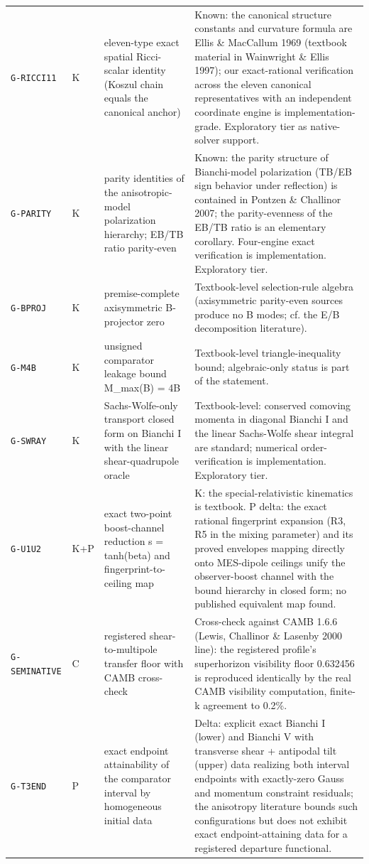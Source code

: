 \documentclass[10pt]{article}
\theoremstyle{definition}
\newcommand{\code}[1]{\texttt{\small #1}}
\begin{document}
\begin{center}
\begin{longtable}{p{2.0cm} p{0.7cm} p{5.4cm} p{6.5cm}}
\code{G-RICCI11} & K & eleven-type exact spatial Ricci-scalar identity (Koszul chain equals the canonical anchor) & Known: the canonical structure constants and curvature formula are Ellis \& MacCallum 1969 (textbook material in Wainwright \& Ellis 1997); our exact-rational verification across the eleven canonical representatives with an independent coordinate engine is implementation-grade. Exploratory tier as native-solver support. \\[2pt]
\code{G-PARITY} & K & parity identities of the anisotropic-model polarization hierarchy; EB/TB ratio parity-even & Known: the parity structure of Bianchi-model polarization (TB/EB sign behavior under reflection) is contained in Pontzen \& Challinor 2007; the parity-evenness of the EB/TB ratio is an elementary corollary. Four-engine exact verification is implementation. Exploratory tier. \\[2pt]
\code{G-BPROJ} & K & premise-complete axisymmetric B-projector zero & Textbook-level selection-rule algebra (axisymmetric parity-even sources produce no B modes; cf. the E/B decomposition literature). \\[2pt]
\code{G-M4B} & K & unsigned comparator leakage bound M\_max(B) = 4B & Textbook-level triangle-inequality bound; algebraic-only status is part of the statement. \\[2pt]
\code{G-SWRAY} & K & Sachs-Wolfe-only transport closed form on Bianchi I with the linear shear-quadrupole oracle & Textbook-level: conserved comoving momenta in diagonal Bianchi I and the linear Sachs-Wolfe shear integral are standard; numerical order-verification is implementation. Exploratory tier. \\[2pt]
\code{G-U1U2} & K+P & exact two-point boost-channel reduction s = tanh(beta) and fingerprint-to-ceiling map & K: the special-relativistic kinematics is textbook. P delta: the exact rational fingerprint expansion (R3, R5 in the mixing parameter) and its proved envelopes mapping directly onto MES-dipole ceilings unify the observer-boost channel with the bound hierarchy in closed form; no published equivalent map found. \\[2pt]
\code{G-SEMINATIVE} & C & registered shear-to-multipole transfer floor with CAMB cross-check & Cross-check against CAMB 1.6.6 (Lewis, Challinor \& Lasenby 2000 line): the registered profile's superhorizon visibility floor 0.632456 is reproduced identically by the real CAMB visibility computation, finite-k agreement to 0.2\%. \\[2pt]
\code{G-T3END} & P & exact endpoint attainability of the comparator interval by homogeneous initial data & Delta: explicit exact Bianchi I (lower) and Bianchi V with transverse shear + antipodal tilt (upper) data realizing both interval endpoints with exactly-zero Gauss and momentum constraint residuals; the anisotropy literature bounds such configurations but does not exhibit exact endpoint-attaining data for a registered departure functional. \\[2pt]

\end{longtable}
\end{center}
\end{document}
